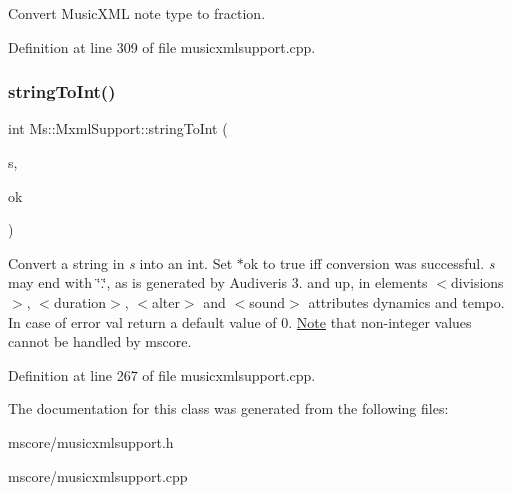 Convert Music\+X\+ML note type to fraction. 

Definition at line 309 of file musicxmlsupport.\+cpp.

\mbox{\label{class_ms_1_1_mxml_support_a27aefb8f8b07d4f332931cd2e72f0b9d}} 
\subsubsection{\texorpdfstring{string\+To\+Int()}{stringToInt()}}
{\footnotesize\ttfamily int Ms\+::\+Mxml\+Support\+::string\+To\+Int (\begin{DoxyParamCaption}\item[{const Q\+String \&}]{s,  }\item[{bool $\ast$}]{ok }\end{DoxyParamCaption})\hspace{0.3cm}{\ttfamily [static]}}

Convert a string in {\itshape s} into an int. Set $\ast$ok to true iff conversion was successful. {\itshape s} may end with \char`\"{}.\char`\"{}, as is generated by Audiveris 3. and up, in elements $<$divisions$>$, $<$duration$>$, $<$alter$>$ and $<$sound$>$ attributes dynamics and tempo. In case of error val return a default value of 0. \hyperlink{class_ms_1_1_note}{Note} that non-\/integer values cannot be handled by mscore. 

Definition at line 267 of file musicxmlsupport.\+cpp.



The documentation for this class was generated from the following files\+:\begin{DoxyCompactItemize}
\item 
mscore/musicxmlsupport.\+h\item 
mscore/musicxmlsupport.\+cpp\end{DoxyCompactItemize}
